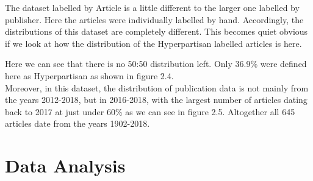 \documentclass[11pt,titlepage,oneside,openany]{book}
\begin{document}
The dataset labelled by Article is a little different to the larger one labelled by publisher. Here the articles were individually labelled by hand. Accordingly, the distributions of this dataset are completely different. This becomes quiet obvious if we look at how the distribution of the Hyperpartisan labelled articles is here.
\begin{figure}[h]
\end{figure}
\noindent Here we can see that there is no 50:50 distribution left. Only 36.9\% were defined here as Hyperpartisan as shown in figure 2.4.\\
\noindent Moreover, in this dataset, the distribution of publication data is not mainly from the years 2012-2018, but in 2016-2018, with the largest number of articles dating back to 2017 at just under 60\% as we can see in figure 2.5. Altogether all 645 articles date from the years 1902-2018.

\section{Data Analysis}
\end{document}
